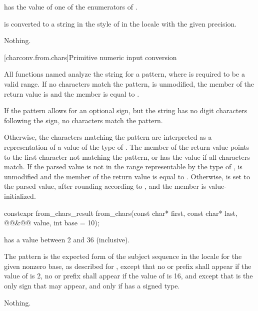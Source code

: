 \begin{itemdescr}
\pnum
\expects
{} has the value of
one of the enumerators of .

\pnum
\effects
{} is converted to a string
in the style of 
in the  locale
with the given precision.

\pnum
\throws
Nothing.
\end{itemdescr}


[charconv.from.chars]{Primitive numeric input conversion}

\pnum
All functions named 
analyze the string 
for a pattern,
where  is required to be a valid range.
If no characters match the pattern,
 is unmodified,
the member  of the return value is  and
the member  is equal to .
\begin{note}
If the pattern allows for an optional sign,
but the string has no digit characters following the sign,
no characters match the pattern.
\end{note}
Otherwise,
the characters matching the pattern
are interpreted as a representation
of a value of the type of .
The member 
of the return value
points to the first character
not matching the pattern,
or has the value 
if all characters match.
If the parsed value
is not in the range
representable by the type of ,
 is unmodified and
the member  of the return value
is equal to .
Otherwise,
 is set to the parsed value,
after rounding according to , and
the member  is value-initialized.

%
\begin{itemdecl}
constexpr from_chars_result from_chars(const char* first, const char* last,
                                       @@&@\itcorr[-1]@ value, int base = 10);
\end{itemdecl}

\begin{itemdescr}
\pnum
\expects
{} has a value between 2 and 36 (inclusive).

\pnum
\effects
The pattern is the expected form of the subject sequence
in the  locale
for the given nonzero base,
as described for ,
except that
no  or  prefix shall appear
if the value of  is 2,
no  or  prefix shall appear
if the value of  is 16,
and except that 
is the only sign that may appear,
and only if  has a signed type.

\pnum
\throws
Nothing.
\end{itemdescr}

